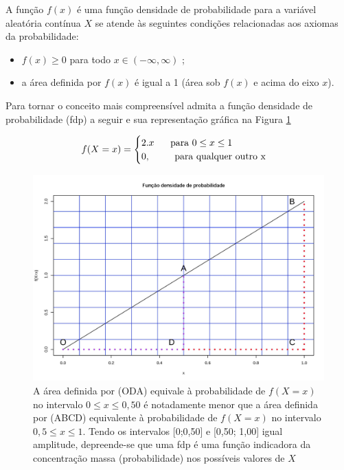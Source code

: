 \documentclass[
]{book}
\begin{document}
\hfill\break

A função \(f(x)\) é uma função densidade de probabilidade para a variável aleatória contínua \(X\) se atende às seguintes condições relacionadas aos axiomas da probabilidade:

\begin{itemize}
    \item $f(x) \ge 0$ para todo $x \in (-\infty, \infty) $ ;
    \item a área definida por $f(x)$ é igual a 1 (área sob $f(x)$ e acima do eixo $x$).
\end{itemize}

\hfill\break

Para tornar o conceito mais compreensível admita a função densidade de probabilidade (fdp) a seguir e sua representação gráfica na Figura \ref{fig:fig15}

\[
f(X=x)=
\begin{cases}
2 . x \hspace{0.6cm} \text{para } 0 \le x \le 1 \\
0, \hspace{0.9cm} \text{para qualquer outro x}\\
\end{cases}
\]

\hfill\break

\begin{figure}

{\centering \includegraphics[width=0.6\linewidth]{images6/massa} 

}

\caption{A área definida por (ODA) equivale à probabilidade de $f(X=x)$ no intervalo $0 \le x \le 0,50$ é notadamente menor que a área definida por (ABCD) equivalente à probabilidade de $f(X=x)$ no intervalo $0,5 \le x \le 1$. Tendo os intervalos [0;0,50] e [0,50; 1,00] igual amplitude, depreende-se que uma fdp é uma função indicadora da concentração massa (probabilidade) nos possíveis valores de $X$}\label{fig:fig15}
\end{figure}
\end{document}
